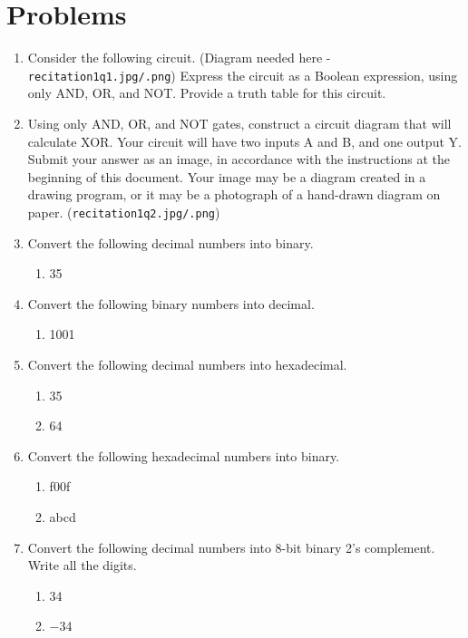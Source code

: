 \documentclass{article}
\begin{document}
\section*{Problems}
\begin{enumerate}
    \item Consider the following circuit.  (Diagram needed here -  \texttt{recitation1q1.jpg/.png}) Express the circuit as a Boolean expression, using only AND, OR, and NOT. Provide a truth table for this circuit.

    \item Using only AND, OR, and NOT gates, construct a circuit diagram that will calculate XOR. Your circuit will have two inputs A and B, and one output Y. Submit your answer as an image, in accordance with the instructions at the beginning of this document. Your image may be a diagram created in a drawing program, or it may be a photograph of a hand-drawn diagram on paper. (\texttt{recitation1q2.jpg/.png})

    \item Convert the following decimal numbers into binary.
    \begin{enumerate}
        \item 35
    \end{enumerate}

    \item Convert the following binary numbers into decimal.
    \begin{enumerate}
        \item 1001
    \end{enumerate}

    \item Convert the following decimal numbers into hexadecimal.
    \begin{enumerate}
        \item 35
        \item 64
    \end{enumerate}

    \item Convert the following hexadecimal numbers into binary.
    \begin{enumerate}
        \item f00f
        \item abcd
    \end{enumerate}

    \item Convert the following decimal numbers into 8-bit binary 2’s complement. Write all the digits.
    \begin{enumerate}
        \item 34
        \item −34
    \end{enumerate}


\end{enumerate}
\end{document}

